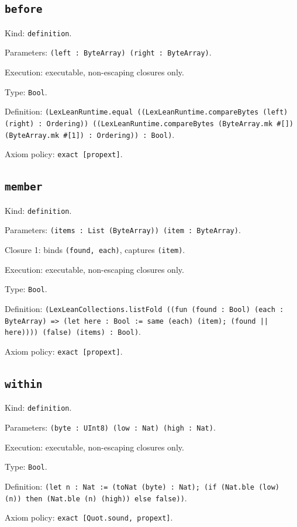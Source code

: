 \documentclass[11pt]{article}
\begin{document}
\subsection*{\texttt{before}}
\noindent Kind: \texttt{definition}.\par
\noindent Parameters: \texttt{(left : ByteArray) (right : ByteArray)}.\par
\noindent Execution: executable, non-escaping closures only.\par
\noindent Type: \texttt{Bool}.\par
\noindent Definition: \texttt{(LexLeanRuntime.equal ((LexLeanRuntime.compareBytes (left) (right) : Ordering)) ((LexLeanRuntime.compareBytes (ByteArray.mk \#[]) (ByteArray.mk \#[1]) : Ordering)) : Bool)}.\par
\noindent Axiom policy: \texttt{exact [propext]}.\par
\subsection*{\texttt{member}}
\noindent Kind: \texttt{definition}.\par
\noindent Parameters: \texttt{(items : List (ByteArray)) (item : ByteArray)}.\par
\noindent Closure 1: binds \texttt{(found, each)}, captures \texttt{(item)}.\par
\noindent Execution: executable, non-escaping closures only.\par
\noindent Type: \texttt{Bool}.\par
\noindent Definition: \texttt{(LexLeanCollections.listFold ((fun (found : Bool) (each : ByteArray) => (let here : Bool := same (each) (item); (found || here)))) (false) (items) : Bool)}.\par
\noindent Axiom policy: \texttt{exact [propext]}.\par
\subsection*{\texttt{within}}
\noindent Kind: \texttt{definition}.\par
\noindent Parameters: \texttt{(byte : UInt8) (low : Nat) (high : Nat)}.\par
\noindent Execution: executable, non-escaping closures only.\par
\noindent Type: \texttt{Bool}.\par
\noindent Definition: \texttt{(let n : Nat := (toNat (byte) : Nat); (if (Nat.ble (low) (n)) then (Nat.ble (n) (high)) else false))}.\par
\noindent Axiom policy: \texttt{exact [Quot.sound, propext]}.\par
\end{document}
